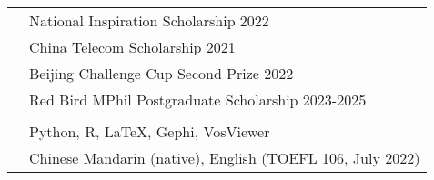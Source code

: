 \documentclass[letterpaper, 11pt]{article}
\begin{document}
\begin{longtable}{p{1.3in}p{4.8in}}


{\color{RoyalBlue}{Selected Honors }} 
&  National Inspiration Scholarship  \hfill 2022\\
{\color{RoyalBlue}{and Scholarships}} 
& China Telecom Scholarship \hfill 2021 \\
& Beijing Challenge Cup Second Prize \hfill 2022 \\
& Red Bird MPhil Postgraduate Scholarship \hfill 2023-2025 \\
& \\


{\color{RoyalBlue}{Skills}} 
&Python, R, LaTeX, Gephi, VosViewer\\
{\color{RoyalBlue}{Languages}} 
&Chinese Mandarin (native), English (TOEFL 106, July 2022) \\








\end{longtable}
\end{document}
